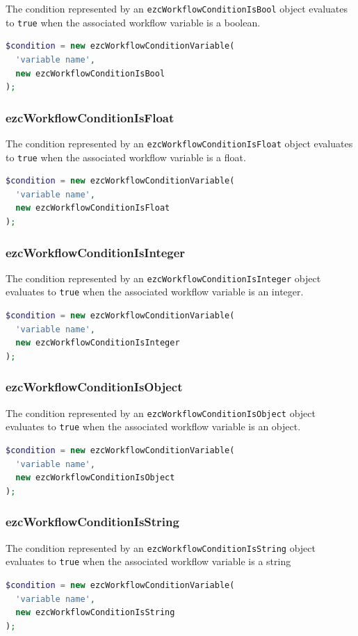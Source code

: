The condition represented by an \texttt{ezcWorkflowConditionIsBool}
object evaluates to \texttt{true} when the associated workflow variable is
a boolean.

\begin{lstlisting}[language=PHP]
$condition = new ezcWorkflowConditionVariable(
  'variable name',
  new ezcWorkflowConditionIsBool
);
\end{lstlisting}

\subsubsection{ezcWorkflowConditionIsFloat}

The condition represented by an \texttt{ezcWorkflowConditionIsFloat}
object evaluates to \texttt{true} when the associated workflow variable is
a float.

\begin{lstlisting}[language=PHP]
$condition = new ezcWorkflowConditionVariable(
  'variable name',
  new ezcWorkflowConditionIsFloat
);
\end{lstlisting}

\subsubsection{ezcWorkflowConditionIsInteger}

The condition represented by an \texttt{ezcWorkflowConditionIsInteger}
object evaluates to \texttt{true} when the associated workflow variable is
an integer.

\begin{lstlisting}[language=PHP]
$condition = new ezcWorkflowConditionVariable(
  'variable name',
  new ezcWorkflowConditionIsInteger
);
\end{lstlisting}

\subsubsection{ezcWorkflowConditionIsObject}

The condition represented by an \texttt{ezcWorkflowConditionIsObject}
object evaluates to \texttt{true} when the associated workflow variable is
an object.

\begin{lstlisting}[language=PHP]
$condition = new ezcWorkflowConditionVariable(
  'variable name',
  new ezcWorkflowConditionIsObject
);
\end{lstlisting}

\subsubsection{ezcWorkflowConditionIsString}

The condition represented by an \texttt{ezcWorkflowConditionIsString}
object evaluates to \texttt{true} when the associated workflow variable is
a string

\begin{lstlisting}[language=PHP]
$condition = new ezcWorkflowConditionVariable(
  'variable name',
  new ezcWorkflowConditionIsString
);
\end{lstlisting}
